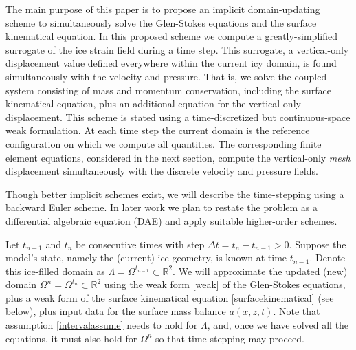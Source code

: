 \documentclass[letterpaper,final,12pt,reqno]{amsart}
\newcommand{\RR}{\mathbb{R}}
\begin{document}
The main purpose of this paper is to propose an implicit domain-updating scheme to simultaneously solve the Glen-Stokes equations and the surface kinematical equation.  In this proposed scheme we compute a greatly-simplified surrogate of the ice strain field during a time step.  This surrogate, a vertical-only displacement value defined everywhere within the current icy domain, is found simultaneously with the velocity and pressure.  That is, we solve the coupled system consisting of mass and momentum conservation, including the surface kinematical equation, plus an additional equation for the vertical-only displacement.  This scheme is stated using a time-discretized but continuous-space weak formulation.  At each time step the current domain is the reference configuration on which we compute all quantities.  The corresponding finite element equations, considered in the next section, compute the vertical-only \emph{mesh} displacement simultaneously with the discrete velocity and pressure fields.

Though better implicit schemes exist, we will describe the time-stepping using a backward Euler scheme.  In later work we plan to restate the problem as a differential algebraic equation (DAE) and apply suitable higher-order schemes.

Let $t_{n-1}$ and $t_n$ be consecutive times with step $\Delta t = t_n - t_{n-1} > 0$.  Suppose the model's state, namely the (current) ice geometry, is known at time $t_{n-1}$.  Denote this ice-filled domain as $\Lambda = \Omega^{t_{n-1}} \subset \RR^2$.  We will approximate the updated (new) domain $\Omega^n = \Omega^{t_n} \subset \RR^2$ using the weak form \eqref{weak} of the Glen-Stokes equations, plus a weak form of the surface kinematical equation \eqref{surfacekinematical} (see below), plus input data for the surface mass balance $a(x,z,t)$.  Note that assumption \eqref{intervalassume} needs to hold for $\Lambda$, and, once we have solved all the equations, it must also hold for $\Omega^n$ so that time-stepping may proceed.
\end{document}
